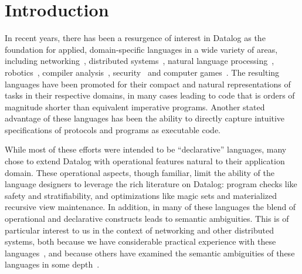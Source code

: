 \section{Introduction}




In recent years, there has been a resurgence of interest in Datalog as
the foundation for applied, domain-specific languages in a wide
variety of areas, including networking~\cite{Loo2009-CACM},
distributed systems~\cite{Belaramani:2009,Chu:2007}, natural language
processing~\cite{Eisner:2004}, robotics~\cite{Ashley-Rollman:2007},
compiler analysis~\cite{Lam:2005}, security~\cite{Li:2003,Zhou:2009, sd3}
and computer games~\cite{White:2007}.  The resulting languages have
been promoted for their compact and natural representations of tasks
in their respective domains, in many cases leading to code that is
orders of magnitude shorter than equivalent imperative programs.
Another stated advantage of these languages has been the ability to
directly capture intuitive specifications of protocols and programs as
executable code.

While most of these efforts were intended to be ``declarative''
languages, many chose to extend Datalog with operational features
natural to their application domain.  These operational aspects,
though familiar, limit the ability of the language designers to
leverage the rich literature on Datalog: program checks like safety
and stratifiability, and optimizations like magic sets and
materialized recursive view maintenance.  In addition, in many of
these languages the blend of operational and declarative constructs
leads to semantic ambiguities.  This is of particular interest to us
in the context of networking and other distributed systems, both
because we have considerable practical experience with these
languages~\cite{boom-techr,Loo2009-CACM}, and because others have
examined the semantic ambiguities of these languages in some
depth~\cite{Mao2009,navarro}.

